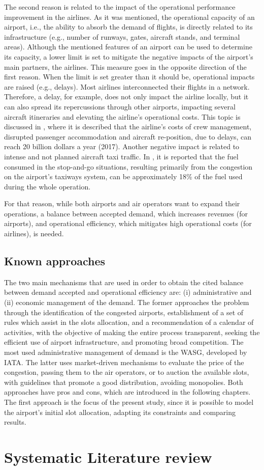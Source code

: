 The second reason is related to the impact of the operational performance improvement in the airlines. As it was mentioned, the operational capacity of an airport, i.e., the ability to absorb the demand of flights, is directly related to its infrastructure (e.g., number of runways, gates, aircraft stands, and terminal areas). Although the mentioned features of an airport can be used to determine its capacity, a lower limit is set to mitigate the negative impacts of the airport’s main partners, the airlines. This measure goes in the opposite direction of the first reason. When the limit is set greater than it should be, operational impacts are raised (e.g., delays). Most airlines interconnected their flights in a network. Therefore, a delay, for example, does not only impact the airline locally, but it can also spread its repercussions through other airports, impacting several aircraft itineraries and elevating the airline’s operational costs. This topic is discussed in \cite{ball2010total}, where it is described that the airline's costs of crew management, disrupted passenger accommodation and aircraft re-position, due to delays, can reach 20 billion dollars a year (2017). Another negative impact is related to intense and not planned aircraft taxi traffic. In \cite{nikoleris2011detailed}, it is reported that the fuel consumed in the stop-and-go situations, resulting primarily from the congestion on the airport’s taxiways system, can be approximately 18\% of the fuel used during the whole operation.

For that reason, while both airports and air operators want to expand their operations, a balance between accepted demand, which increases revenues (for airports), and operational efficiency, which mitigates high operational costs (for airlines), is needed.

\subsection{Known approaches}

The two main mechanisms that are used in order to obtain the cited balance between demand accepted and operational efficiency are: (i) administrative and (ii) economic management of the demand. The former approaches the problem through the identification of the congested airports, establishment of a set of rules which assist in the slots allocation, and a recommendation of a calendar of activities, with the objective of making the entire process transparent, seeking the efficient use of airport infrastructure, and promoting broad competition. The most used administrative management of demand is the WASG, developed by IATA. The latter uses market-driven mechanisms to evaluate the price of the congestion, passing them to the air operators, or to auction the available slots, with guidelines that promote a good distribution, avoiding monopolies. Both approaches have pros and cons, which are introduced in the following chapters. The first approach is the focus of the present study, since it is possible to model the airport’s initial slot allocation, adapting its constraints and comparing results.

\section{Systematic Literature review}